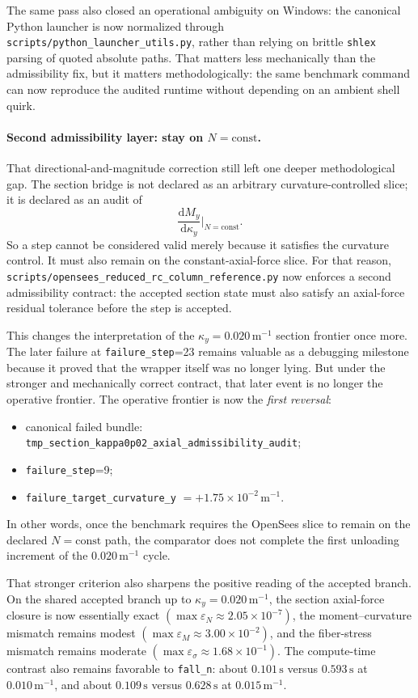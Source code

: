 The same pass also closed an operational ambiguity on Windows: the canonical
Python launcher is now normalized through
\texttt{scripts/python\_launcher\_utils.py}, rather than relying on brittle
\texttt{shlex} parsing of quoted absolute paths.  That matters less
mechanically than the admissibility fix, but it matters methodologically: the
same benchmark command can now reproduce the audited runtime without depending
on an ambient shell quirk.

\paragraph{Second admissibility layer: stay on \(N=\mathrm{const}\).}
That directional-and-magnitude correction still left one deeper methodological
gap.  The section bridge is not declared as an arbitrary curvature-controlled
slice; it is declared as an audit of
\[
  \frac{\mathrm{d}M_y}{\mathrm{d}\kappa_y}\Big|_{N=\mathrm{const}}.
\]
So a step cannot be considered valid merely because it satisfies the curvature
control.  It must also remain on the constant-axial-force slice.  For that
reason, \texttt{scripts/opensees\_reduced\_rc\_column\_reference.py} now
enforces a second admissibility contract: the accepted section state must also
satisfy an axial-force residual tolerance before the step is accepted.

This changes the interpretation of the \(\kappa_y=0.020\,\mathrm{m}^{-1}\)
section frontier once more.  The later failure at
\texttt{failure\_step}=23 remains valuable as a debugging milestone because it
proved that the wrapper itself was no longer lying.  But under the stronger
and mechanically correct contract, that later event is no longer the operative
frontier.  The operative frontier is now the \emph{first reversal}:
\begin{itemize}
  \item canonical failed bundle:
    \texttt{tmp\_section\_kappa0p02\_axial\_admissibility\_audit};
  \item \texttt{failure\_step}=9;
  \item \texttt{failure\_target\_curvature\_y}
    \(=+1.75\times10^{-2}\,\mathrm{m}^{-1}\).
\end{itemize}
In other words, once the benchmark requires the OpenSees slice to remain on
the declared \(N=\mathrm{const}\) path, the comparator does not complete the
first unloading increment of the \(0.020\,\mathrm{m}^{-1}\) cycle.

That stronger criterion also sharpens the positive reading of the accepted
branch.  On the shared accepted branch up to
\(\kappa_y=0.020\,\mathrm{m}^{-1}\), the section axial-force closure is now
essentially exact
\((\max \varepsilon_N \approx 2.05\times10^{-7})\), the
moment--curvature mismatch remains modest
\((\max \varepsilon_M \approx 3.00\times10^{-2})\), and the
fiber-stress mismatch remains moderate
\((\max \varepsilon_\sigma \approx 1.68\times10^{-1})\).
The compute-time contrast also remains favorable to \texttt{fall\_n}: about
\(0.101\,\mathrm{s}\) versus \(0.593\,\mathrm{s}\) at
\(0.010\,\mathrm{m}^{-1}\), and about
\(0.109\,\mathrm{s}\) versus \(0.628\,\mathrm{s}\) at
\(0.015\,\mathrm{m}^{-1}\).

